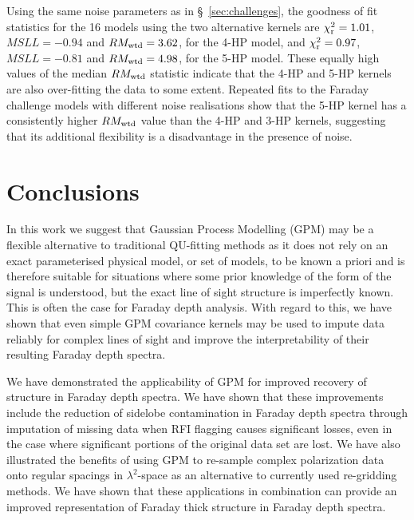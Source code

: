 \documentclass[fleqn,usenatbib]{mnras}
\begin{document}
%
%
%
Using the same noise parameters as in \S~\ref{sec:challenges}, the goodness of fit statistics for the 16 models using the two alternative kernels are $\chi^2_{\rm r} = 1.01$, $MSLL=-0.94$ and $RM_{\rm wtd}=3.62$, for the 4-HP model, and $\chi^2_{\rm r} = 0.97$, $MSLL=-0.81$ and $RM_{\rm wtd}=4.98$, for the 5-HP model.
These equally high values of the median $RM_{\rm wtd}$ statistic indicate that the 4-HP and 5-HP kernels are also over-fitting the data to some extent. Repeated fits to the Faraday challenge models with different noise realisations show that the 5-HP kernel has a consistently higher $RM_{\rm wtd}$ value than the 4-HP and 3-HP kernels, suggesting that its additional flexibility is a disadvantage in the presence of noise.

\section{Conclusions}
\label{sec:conclusions}

In this work we suggest that Gaussian Process Modelling (GPM) may be a flexible alternative to traditional QU-fitting methods as it does not rely on an exact parameterised physical model, or set of models, to be known a priori and is therefore suitable for situations where some prior knowledge of the form of the signal is understood, but the exact line of sight structure is imperfectly known. This is often the case for Faraday depth analysis. With regard to this, we have shown that even simple GPM covariance kernels may be used to impute data reliably for complex lines of sight and improve the interpretability of their resulting Faraday depth spectra.

We have demonstrated the applicability of GPM for improved recovery of structure in Faraday depth spectra. We have shown that these improvements include the reduction of sidelobe contamination in Faraday depth spectra through imputation of missing data when RFI flagging causes significant losses, even in the case where significant portions of the original data set are lost. We have also illustrated the benefits of using GPM to re-sample complex polarization data onto regular spacings in $\lambda^2$-space as an alternative to currently used re-gridding methods. We have shown that these applications in combination can provide an improved representation of Faraday thick structure in Faraday depth spectra.
\end{document}
